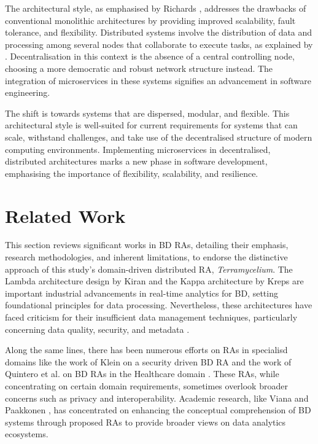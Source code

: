 \documentclass[journal]{IEEEtran}
\begin{document}
The architectural style, as emphasised by Richards \cite{richardson2018microservices}, addresses the drawbacks of conventional monolithic architectures by providing improved scalability, fault tolerance, and flexibility. Distributed systems involve the distribution of data and processing among several nodes that collaborate to execute tasks, as explained by \cite{Coulouris2005}. Decentralisation in this context is the absence of a central controlling node, choosing a more democratic and robust network structure instead. The integration of microservices in these systems signifies an advancement in software engineering. 

The shift is towards systems that are dispersed, modular, and flexible. This architectural style is well-suited for current requirements for systems that can scale, withstand challenges, and take use of the decentralised structure of modern computing environments. Implementing microservices in decentralised, distributed architectures marks a new phase in software development, emphasising the importance of flexibility, scalability, and resilience.


\section{Related Work}
\label{sec:related_work}

This section reviews significant works in BD RAs, detailing their emphasis, research methodologies, and inherent limitations, to endorse the distinctive approach of this study's domain-driven distributed RA, \textit{Terramycelium}. The Lambda architecture design by Kiran \cite{kiran2015lambda} and the Kappa architecture by Kreps \cite{kreps2014} are important industrial advancements in real-time analytics for BD, setting foundational principles for data processing. Nevertheless, these architectures have faced criticism for their insufficient data management techniques, particularly concerning data quality, security, and metadata \cite{AtaeiACIS}. 

Along the same lines, there has been numerous efforts on RAs in specialisd domains like the work of Klein on a security driven BD RA \cite{klein2016reference} and the work of Quintero et al. on BD RAs in the Healthcare domain \cite{quintero2019ibm}. These RAs, while concentrating on certain domain requirements, sometimes overlook broader concerns such as privacy and interoperability. Academic research, like Viana \cite{viana2014proposal} and Paakkonen \cite{paakkonen2015reference}, has concentrated on enhancing the conceptual comprehension of BD systems through proposed RAs to provide broader views on data analytics ecosystems. 
\end{document}
